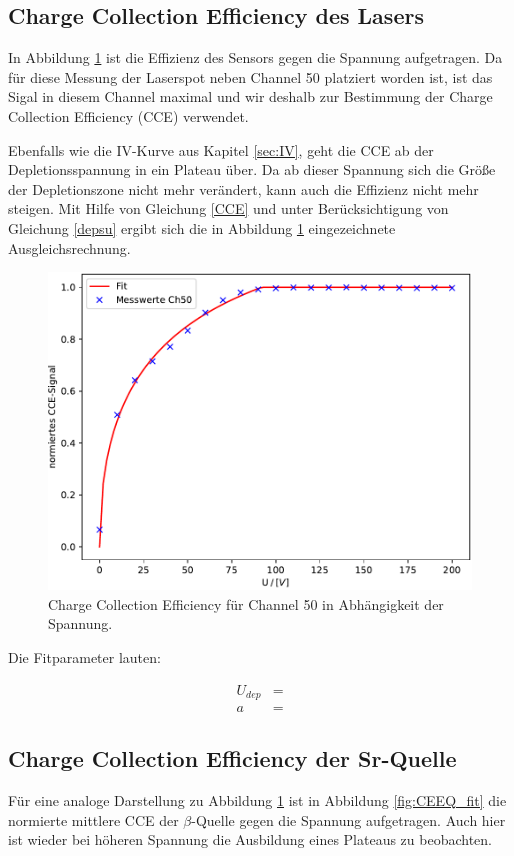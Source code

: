 \subsection{Charge Collection Efficiency des Lasers}
\label{sec:CCE}
In Abbildung \ref{fig:CEE_fit} ist die Effizienz des Sensors gegen die Spannung aufgetragen. Da für diese Messung der Laserspot neben Channel 50 platziert worden ist, ist das Sigal in diesem Channel maximal und wir deshalb zur Bestimmung der Charge Collection Efficiency (CCE) verwendet.

Ebenfalls wie die IV-Kurve aus Kapitel \ref{sec:IV}, geht die CCE ab der Depletionsspannung in ein Plateau über. Da ab dieser Spannung sich die Größe der Depletionszone nicht mehr verändert, kann auch die Effizienz nicht mehr steigen. Mit Hilfe von Gleichung \ref{CCE} und unter Berücksichtigung von Gleichung \ref{depsu} ergibt sich die in Abbildung \ref{fig:CEE_fit} eingezeichnete Ausgleichsrechnung.

\begin{figure}[H]
  \centering
  \includegraphics{build/CCE_fit.pdf}
  \caption{Charge Collection Efficiency für Channel 50 in Abhängigkeit der Spannung.}
  \label{fig:CEE_fit}
\end{figure}

Die Fitparameter lauten:

\begin{align}
  U_{dep} &=  \\
  a &= 
\end{align}

\subsection{Charge Collection Efficiency der Sr-Quelle}
Für eine analoge Darstellung zu Abbildung \ref{fig:CEE_fit} ist in Abbildung \ref{fig:CEEQ_fit} die normierte mittlere CCE der $\beta$-Quelle gegen die Spannung aufgetragen. Auch hier ist wieder bei höheren Spannung die Ausbildung eines Plateaus zu beobachten.

